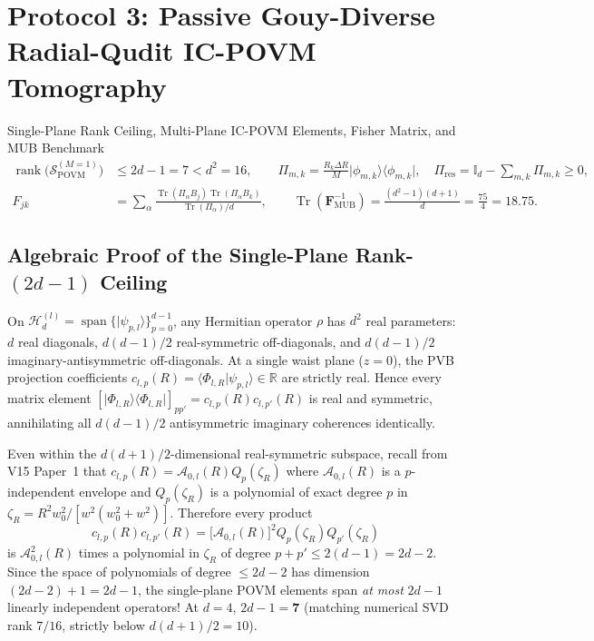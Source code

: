 \documentclass[10pt,letterpaper]{article}
\newcommand{\braket}[2]{\langle #1 | #2 \rangle}
\newcommand{\ket}[1]{\lvert #1 \rangle}
\newcommand{\bra}[1]{\langle #1 \rvert}
\numberwithin{equation}{section}
\begin{document}
\section{Protocol 3: Passive Gouy-Diverse Radial-Qudit IC-POVM Tomography}
\label{sec:p2_povm}

\begin{targeteq}{Single-Plane Rank Ceiling, Multi-Plane IC-POVM Elements, Fisher Matrix, and MUB Benchmark}
\begin{align*}
  \operatorname{rank}\!\bigl(\mathcal{S}_{\mathrm{POVM}}^{(M=1)}\bigr) &\le 2d - 1 = 7 < d^2 = 16, \qquad
  \Pi_{m,k} = \frac{R_k\Delta R}{M}\ket{\phi_{m,k}}\bra{\phi_{m,k}}, \quad \Pi_{\mathrm{res}} = \mathbb{I}_d - \sum_{m,k}\Pi_{m,k} \ge 0, \\
  F_{jk} &= \sum_\alpha \frac{\operatorname{Tr}(\Pi_\alpha B_j)\operatorname{Tr}(\Pi_\alpha B_k)}{\operatorname{Tr}(\Pi_\alpha)/d}, \qquad
  \operatorname{Tr}\!\left(\mathbf{F}_{\mathrm{MUB}}^{-1}\right) = \frac{(d^2-1)(d+1)}{d} = \frac{75}{4} = 18.75.
\end{align*}
\end{targeteq}

\subsection{Algebraic Proof of the Single-Plane Rank-$(2d-1)$ Ceiling}
On $\mathcal{H}_d^{(l)} = \operatorname{span}\{\ket{\psi_{p,l}}\}_{p=0}^{d-1}$, any Hermitian operator $\rho$ has $d^2$ real parameters: $d$ real diagonals, $d(d-1)/2$ real-symmetric off-diagonals, and $d(d-1)/2$ imaginary-antisymmetric off-diagonals. At a single waist plane ($z=0$), the PVB projection coefficients $c_{l,p}(R) = \braket{\Phi_{l,R}}{\psi_{p,l}} \in \mathbb{R}$ are strictly real. Hence every matrix element $[\ket{\Phi_{l,R}}\bra{\Phi_{l,R}}]_{pp'} = c_{l,p}(R) c_{l,p'}(R)$ is real and symmetric, annihilating all $d(d-1)/2$ antisymmetric imaginary coherences identically.

Even within the $d(d+1)/2$-dimensional real-symmetric subspace, recall from V15 Paper~1 that $c_{l,p}(R) = \mathcal{A}_{0,l}(R) Q_p(\zeta_R)$ where $\mathcal{A}_{0,l}(R)$ is a $p$-independent envelope and $Q_p(\zeta_R)$ is a polynomial of exact degree $p$ in $\zeta_R = R^2 w_0^2/[w^2(w_0^2+w^2)]$. Therefore every product
\begin{equation}
  c_{l,p}(R) c_{l,p'}(R) = \bigl[\mathcal{A}_{0,l}(R)\bigr]^2 Q_p(\zeta_R) Q_{p'}(\zeta_R)
\end{equation}
is $\mathcal{A}_{0,l}^2(R)$ times a polynomial in $\zeta_R$ of degree $p + p' \le 2(d-1) = 2d - 2$. Since the space of polynomials of degree $\le 2d-2$ has dimension $(2d-2) + 1 = 2d - 1$, the single-plane POVM elements span \emph{at most} $2d-1$ linearly independent operators! At $d = 4$, $2d - 1 = \mathbf{7}$ (matching numerical SVD rank $7/16$, strictly below $d(d+1)/2 = 10$).
\end{document}
